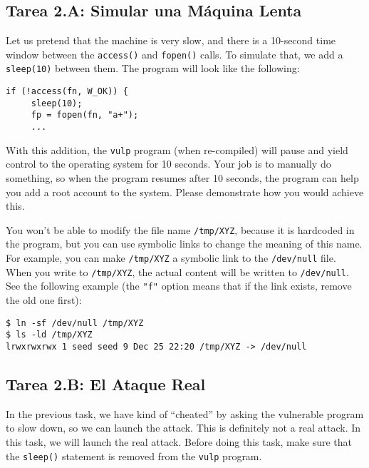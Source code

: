 \subsection{Tarea 2.A: Simular una Máquina Lenta} 

Let us pretend that the machine is very slow, and there is a 10-second time window between
the \texttt{access()} and \texttt{fopen()} calls. To simulate that, we 
add a \texttt{sleep(10)} between them. The program will look like the following:

\begin{lstlisting}
if (!access(fn, W_OK)) {
     sleep(10);
     fp = fopen(fn, "a+");
     ...
\end{lstlisting}
 
With this addition, the \texttt{vulp} program (when re-compiled)
will pause and yield control to the operating system for 10 seconds.
Your job is to manually do something, so when the program resumes
after 10 seconds, the program can help you
add a root account to the system. Please 
demonstrate how you would achieve this. 

You won't be able to modify the file name \texttt{/tmp/XYZ}, because 
it is hardcoded in the program, but you can use symbolic links to 
change the meaning of this name. For example, you can make 
\texttt{/tmp/XYZ} a symbolic link to the \texttt{/dev/null} file. 
When you write to \texttt{/tmp/XYZ}, the actual content will be written
to \texttt{/dev/null}. See the following example (the \texttt{"f"} option 
means that if the link exists, remove the old one first): 

\begin{lstlisting}
$ ln -sf /dev/null /tmp/XYZ
$ ls -ld /tmp/XYZ
lrwxrwxrwx 1 seed seed 9 Dec 25 22:20 /tmp/XYZ -> /dev/null
\end{lstlisting}
 
\subsection{Tarea 2.B: El Ataque Real}

In the previous task, we have kind of ``cheated'' by asking the vulnerable program
to slow down, so we can launch the attack. This is definitely not a real attack.
In this task, we will launch the real attack. 
Before doing this task, make sure that the \texttt{sleep()} statement is removed 
from the \texttt{vulp} program. 


